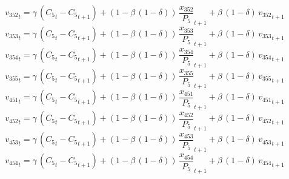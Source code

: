 \begin{dmath}
{{v_{352}}}_{t}={{\gamma}}\, \left({{C_{5}}}_{t}-{{C_{5}}}_{t+1}\right)+\left(1-{{\beta}}\, \left(1-{{\delta}}\right)\right)\, {{\frac{x_{352}}{P_{5}}}}_{t+1}+{{\beta}}\, \left(1-{{\delta}}\right)\, {{v_{352}}}_{t+1}
\end{dmath}
\begin{dmath}
{{v_{353}}}_{t}={{\gamma}}\, \left({{C_{5}}}_{t}-{{C_{5}}}_{t+1}\right)+\left(1-{{\beta}}\, \left(1-{{\delta}}\right)\right)\, {{\frac{x_{353}}{P_{5}}}}_{t+1}+{{\beta}}\, \left(1-{{\delta}}\right)\, {{v_{353}}}_{t+1}
\end{dmath}
\begin{dmath}
{{v_{354}}}_{t}={{\gamma}}\, \left({{C_{5}}}_{t}-{{C_{5}}}_{t+1}\right)+\left(1-{{\beta}}\, \left(1-{{\delta}}\right)\right)\, {{\frac{x_{354}}{P_{5}}}}_{t+1}+{{\beta}}\, \left(1-{{\delta}}\right)\, {{v_{354}}}_{t+1}
\end{dmath}
\begin{dmath}
{{v_{355}}}_{t}={{\gamma}}\, \left({{C_{5}}}_{t}-{{C_{5}}}_{t+1}\right)+\left(1-{{\beta}}\, \left(1-{{\delta}}\right)\right)\, {{\frac{x_{355}}{P_{5}}}}_{t+1}+{{\beta}}\, \left(1-{{\delta}}\right)\, {{v_{355}}}_{t+1}
\end{dmath}
\begin{dmath}
{{v_{451}}}_{t}={{\gamma}}\, \left({{C_{5}}}_{t}-{{C_{5}}}_{t+1}\right)+\left(1-{{\beta}}\, \left(1-{{\delta}}\right)\right)\, {{\frac{x_{451}}{P_{5}}}}_{t+1}+{{\beta}}\, \left(1-{{\delta}}\right)\, {{v_{451}}}_{t+1}
\end{dmath}
\begin{dmath}
{{v_{452}}}_{t}={{\gamma}}\, \left({{C_{5}}}_{t}-{{C_{5}}}_{t+1}\right)+\left(1-{{\beta}}\, \left(1-{{\delta}}\right)\right)\, {{\frac{x_{452}}{P_{5}}}}_{t+1}+{{\beta}}\, \left(1-{{\delta}}\right)\, {{v_{452}}}_{t+1}
\end{dmath}
\begin{dmath}
{{v_{453}}}_{t}={{\gamma}}\, \left({{C_{5}}}_{t}-{{C_{5}}}_{t+1}\right)+\left(1-{{\beta}}\, \left(1-{{\delta}}\right)\right)\, {{\frac{x_{453}}{P_{5}}}}_{t+1}+{{\beta}}\, \left(1-{{\delta}}\right)\, {{v_{453}}}_{t+1}
\end{dmath}
\begin{dmath}
{{v_{454}}}_{t}={{\gamma}}\, \left({{C_{5}}}_{t}-{{C_{5}}}_{t+1}\right)+\left(1-{{\beta}}\, \left(1-{{\delta}}\right)\right)\, {{\frac{x_{454}}{P_{5}}}}_{t+1}+{{\beta}}\, \left(1-{{\delta}}\right)\, {{v_{454}}}_{t+1}
\end{dmath}
